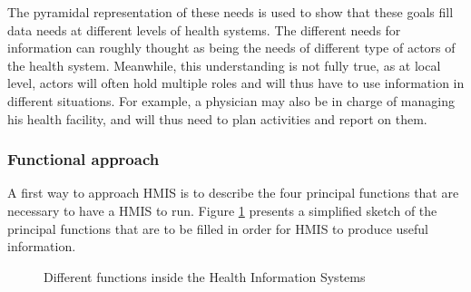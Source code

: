 The pyramidal representation of these needs is used to show that these goals fill data needs at different levels of health systems. The different needs for information can roughly thought as being the needs of different type of actors of the health system. Meanwhile, this understanding is not fully true, as at local level, actors will often hold multiple roles and will thus have to use information in different situations. For example, a physician may also be in charge of managing his health facility, and will thus need to plan activities and report on them.



	   \subsubsection{Functional approach}
	    \label{sec_function}

A first way to approach HMIS is to describe the four principal functions that are necessary to have a HMIS to run. Figure \ref{HMISFunctions} presents a simplified sketch of the principal functions that are to be filled in order for HMIS to produce useful information.

\begin{figure}[h]
\begin{center}
\end{center}
\caption{Different functions inside the Health Information Systems}
\label{HMISFunctions}
\end{figure}


